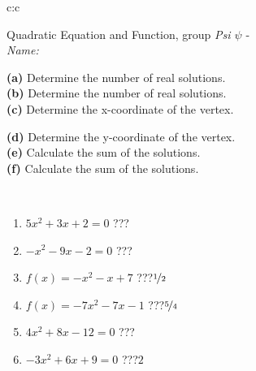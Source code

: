 \documentclass[10pt]{report}
\begin{document}
\begin{tabular}{c:c}
\begin{minipage}[c][104.5mm][t]{0.5\linewidth}
\begin{center}
\vspace{7mm}
{\huge {\LARGE Quadratic Equation and Function}, group \textit{Psi $\psi$} -}\\[5mm]
\textit{Name:}\phantom{xxxxxxxxxxxxxxxxxxxxxxxxxxxxxxxxxxxxxxxxxxxxxxxxxxxxxxxxxxxxxxxxx}\\[5mm]
\begin{minipage}{0.95\linewidth}
\begin{center}
{\small \begin{minipage}{0.5\textwidth}
\textbf{(a)} Determine the number of real solutions. \\[1mm]
\textbf{(b)} Determine the number of real solutions. \\[1mm]
\textbf{(c)} Determine the x-coordinate of the vertex.
\end{minipage} \begin{minipage}{0.49\textwidth}
\textbf{(d)} Determine the y-coordinate of the vertex. \\[1mm]
\textbf{(e)} Calculate the sum of the solutions. \\[1mm]
\textbf{(f)} Calculate the sum of the solutions.
\end{minipage}
}
\end{center}
\end{minipage}
\\[4mm]
\begin{minipage}{0.79\linewidth}
\begin{center}
\begin{varwidth}{\linewidth}
\begin{enumerate}
\Large
\item $5x^2+3x+2=0$\quad \dotfill\; ???\;\dotfill {}
\item $-x^2-9x-2=0$\quad \dotfill\; ???\;\dotfill {}
\item $f(x)=-x^2-x+7$\quad \dotfill\; ???\;\dotfill \quad $\nicefrac{1}{2}$
\item $f(x)=-7x^2-7x-1$\quad \dotfill\; ???\;\dotfill \quad $\nicefrac{5}{4}$
\item $4x^2+8x-12=0$\quad \dotfill\; ???\;\dotfill {}
\item $-3x^2+6x+9=0$\quad \dotfill\; ???\;\dotfill \quad $2$
\end{enumerate}
\end{varwidth}
\end{center}

\end{minipage}
\end{center}
\end{minipage}
\end{tabular}
\end{document}
